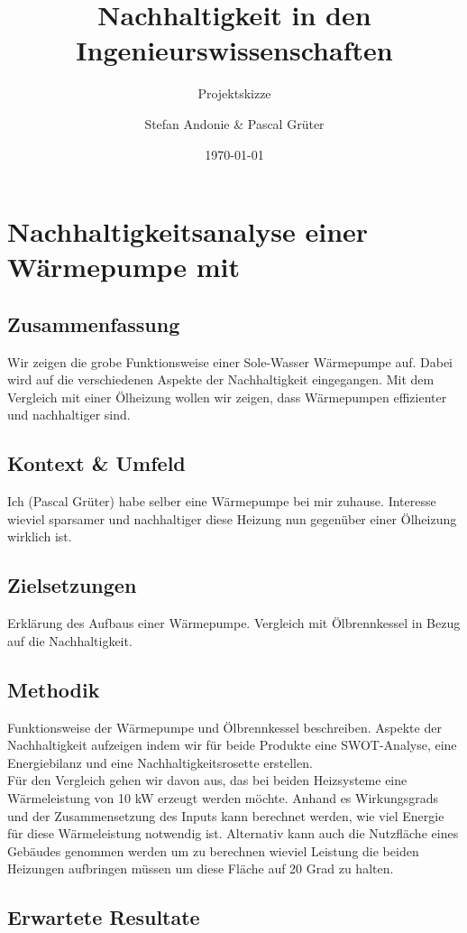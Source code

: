 \documentclass[09pt,paper=a4,final]{scrartcl}
\title{Nachhaltigkeit in den Ingenieurswissenschaften}
\subtitle{Projektskizze}
\author{Stefan Andonie \& Pascal Grüter}
\date{\today{}}
\begin{document}
\section*{Nachhaltigkeitsanalyse einer Wärmepumpe mit}

\subsection*{Zusammenfassung}

Wir zeigen die grobe Funktionsweise einer Sole-Wasser Wärmepumpe auf. Dabei wird auf die verschiedenen Aspekte der Nachhaltigkeit eingegangen. Mit dem Vergleich mit einer Ölheizung wollen wir zeigen, dass Wärmepumpen effizienter und nachhaltiger sind.

\subsection*{Kontext \& Umfeld}

Ich (Pascal Grüter) habe selber eine Wärmepumpe bei mir zuhause. Interesse wieviel sparsamer und nachhaltiger diese Heizung nun gegenüber einer Ölheizung wirklich ist.

\subsection*{Zielsetzungen}

Erklärung des Aufbaus einer Wärmepumpe.
Vergleich mit Ölbrennkessel in Bezug auf die Nachhaltigkeit.

\subsection*{Methodik}

Funktionsweise der Wärmepumpe und Ölbrennkessel beschreiben. Aspekte der Nachhaltigkeit aufzeigen indem wir für beide Produkte eine SWOT-Analyse, eine Energiebilanz und eine Nachhaltigkeitsrosette erstellen. \\
Für den Vergleich gehen wir davon aus, das bei beiden Heizsysteme eine Wärmeleistung von 10 kW erzeugt werden möchte. Anhand es Wirkungsgrads und der Zusammensetzung des Inputs kann berechnet werden, wie viel Energie für diese Wärmeleistung notwendig ist. Alternativ kann auch die Nutzfläche eines Gebäudes genommen werden um zu berechnen wieviel Leistung die beiden Heizungen aufbringen müssen um diese Fläche auf 20 Grad zu halten.



\subsection*{Erwartete Resultate}
\end{document}
